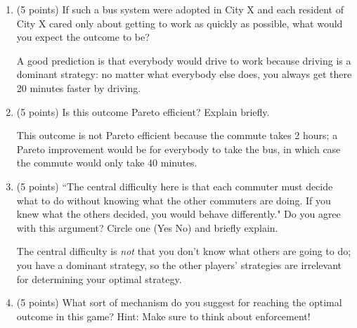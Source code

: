 \documentclass[twoside]{article}
\begin{document}
\begin{enumerate}
    \begin{enumerate}
    \item \begin{EXAM} (5 points) If such a bus system were adopted in City X and each resident of City X cared only about getting to work as quickly as possible, what would you expect the outcome to be? \vspace{3cm} \end{EXAM}

\begin{KEY}
A good prediction is that everybody would drive to work because driving is a dominant strategy: no matter what everybody else does, you always get there 20 minutes faster by driving.
\end{KEY}


    \item \begin{EXAM} (5 points) Is this outcome Pareto efficient? Explain briefly. \vspace{3cm} \end{EXAM}

\begin{KEY}
This outcome is not Pareto efficient because the commute takes 2 hours; a Pareto improvement would be for everybody to take the bus, in which case the commute would only take 40 minutes.
\end{KEY}


    \item \begin{EXAM} (5 points) ``The central difficulty here is that each commuter must decide what to do without knowing what the other commuters are doing. If you knew what the others decided, you would behave differently." Do you agree with this argument? Circle one (Yes  No) and briefly explain. \vspace{2cm} \end{EXAM}

\begin{KEY}
The central difficulty is \emph{not} that you don't know what others are going to do; you have a dominant strategy, so the other players' strategies are irrelevant for determining your optimal strategy.
\end{KEY}


    \item \begin{EXAM} (5 points) What sort of mechanism do you suggest for reaching the optimal outcome in this game? Hint: Make sure to think about enforcement! \vspace{3cm} \end{EXAM}


\end{enumerate}
\end{enumerate}
\end{document}
